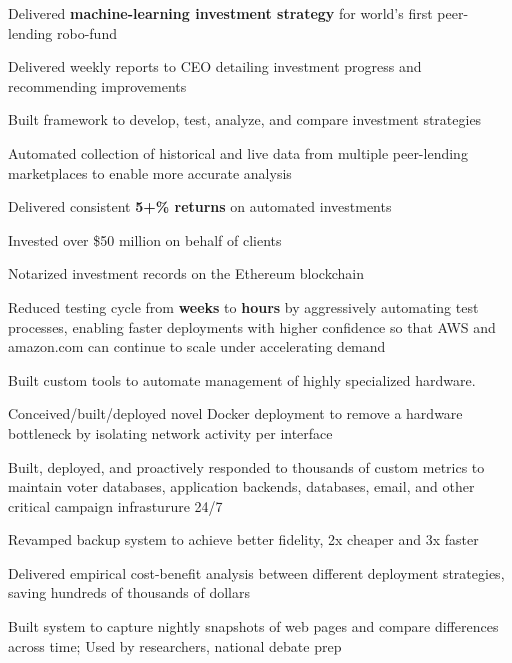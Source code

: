\documentclass[]{resume}
\begin{document}
\begin{minipage}[t]{0.64\textwidth}
\begin{tightemize}
\item Delivered \textbf{machine-learning investment strategy} for world's first peer-lending robo-fund
\item Delivered weekly reports to CEO detailing investment progress and recommending improvements
\item Built framework to develop, test, analyze, and compare investment strategies
\item Automated collection of historical and live data from multiple peer-lending marketplaces to enable more accurate analysis
\item Delivered consistent \textbf{5+\% returns} on automated investments
\item Invested over \$50 million on behalf of clients
\item Notarized investment records on the Ethereum blockchain
\end{tightemize}
\sectionsep

\begin{tightemize}
\item Reduced testing cycle from \textbf{weeks} to \textbf{hours} by aggressively automating test processes, enabling faster deployments with higher confidence so that AWS and amazon.com can continue to scale under accelerating demand
\item Built custom tools to automate management of highly specialized hardware.
\item Conceived/built/deployed novel Docker deployment to remove a hardware bottleneck by isolating network activity per interface
\end{tightemize}
\sectionsep

\begin{tightemize}
\item Built, deployed, and proactively responded to thousands of custom metrics to maintain voter databases, application backends, databases, email, and other critical campaign infrasturure 24/7
\item Revamped backup system to achieve better fidelity, 2x cheaper and 3x faster
\item Delivered empirical cost-benefit analysis between different deployment strategies, saving hundreds of thousands of dollars
\item Built system to capture nightly snapshots of web pages and compare differences across time; Used by researchers, national debate prep
\end{tightemize}
\sectionsep


\end{minipage}
\end{document}
